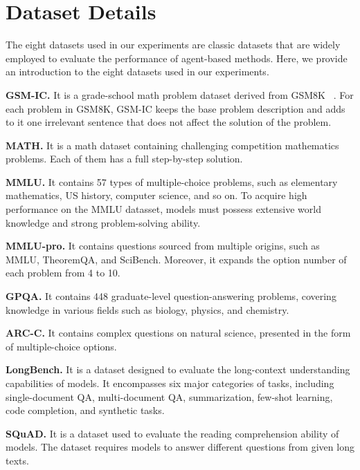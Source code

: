 \section{Dataset Details}
\label{appendix_dataset_detail}

The eight datasets used in our experiments are classic datasets that are widely employed to evaluate the performance of agent-based methods. Here, we provide an introduction to the eight datasets used in our experiments.

\textbf{GSM-IC.}  It is a grade-school math problem dataset derived from GSM8K ~\citep{cobbe2021training}.  For each problem in GSM8K, GSM-IC keeps the base problem description and adds to it one irrelevant sentence that does not affect the solution of the problem.

\textbf{MATH.} It is a math dataset containing challenging competition mathematics problems. Each of them has a full step-by-step solution.

\textbf{MMLU.} It contains 57 types of multiple-choice problems, such as elementary mathematics, US history, computer science, and so on. To acquire high performance on the MMLU datasset, models must possess extensive world knowledge and strong problem-solving ability.

\textbf{MMLU-pro.} It contains questions sourced from multiple origins, such as MMLU, TheoremQA, and SciBench. Moreover, it expands the option number of each problem from 4 to 10.

\textbf{GPQA.} It contains 448 graduate-level question-answering problems, covering knowledge in various fields such as biology, physics, and chemistry.

\textbf{ARC-C.} It contains complex questions on natural science, presented in the form of multiple-choice options.

\renewcommand{\dblfloatpagefraction}{.9}



\textbf{LongBench.} It is a dataset designed to evaluate the long-context understanding capabilities of models. It encompasses six major categories of tasks, including single-document QA, multi-document QA, summarization, few-shot learning, code completion, and synthetic tasks.

\textbf{SQuAD.} It is a dataset used to evaluate the reading comprehension ability of models. The dataset requires models to answer different questions from given long texts.